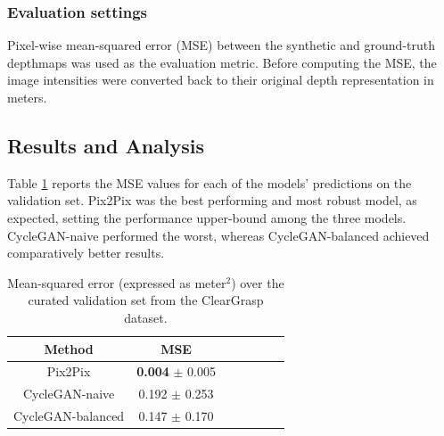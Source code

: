 \subsubsection{Evaluation settings}
Pixel-wise mean-squared error (MSE) between the synthetic and ground-truth depthmaps was used as the evaluation metric. Before computing the MSE, the image intensities were converted back to their original depth representation in meters.


\subsection{Results and Analysis}
Table \ref{tab:rcleargrasp_quant} reports the MSE values for each of the models' predictions on the validation set. Pix2Pix was the best performing and most robust model, as expected, setting the performance upper-bound among the three models. CycleGAN-naive performed the worst, whereas CycleGAN-balanced achieved comparatively better results. 

\begin{table}[h!]
    \small
    \centering
    \begin{tabular}{ccccccc}
        \textbf{Method} & \textbf{MSE} \\
        \hline
        Pix2Pix    & \textbf{0.004} $\pm$ 0.005 \\
        CycleGAN-naive    & 0.192 $\pm$ 0.253 \\
        CycleGAN-balanced    & 0.147 $\pm$ 0.170 \\
    \end{tabular}
    \caption{Mean-squared error (expressed as meter$^2$) over the curated validation set from the ClearGrasp dataset.}
    \label{tab:rcleargrasp_quant}
\end{table}

